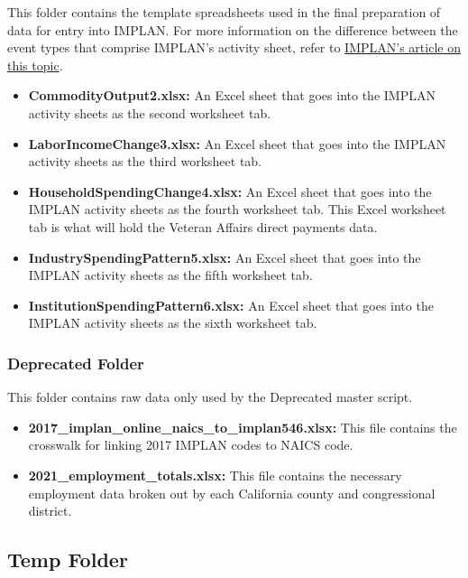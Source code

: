 \documentclass[
]{book}
\providecommand{\tightlist}{%
  \setlength{\itemsep}{0pt}\setlength{\parskip}{0pt}}
\begin{document}
This folder contains the template spreadsheets used in the final preparation of data for entry into IMPLAN. For more information on the difference between the event types that comprise IMPLAN's activity sheet, refer to \href{https://support.implan.com/hc/en-us/articles/360019638713-Explaining-Event-Types}{IMPLAN's article on this topic}.

\begin{itemize}
\tightlist
\item
  \textbf{CommodityOutput2.xlsx:} An Excel sheet that goes into the IMPLAN activity sheets as the second worksheet tab.
\item
  \textbf{LaborIncomeChange3.xlsx:} An Excel sheet that goes into the IMPLAN activity sheets as the third worksheet tab.
\item
  \textbf{HouseholdSpendingChange4.xlsx:} An Excel sheet that goes into the IMPLAN activity sheets as the fourth worksheet tab. This Excel worksheet tab is what will hold the Veteran Affairs direct payments data.
\item
  \textbf{IndustrySpendingPattern5.xlsx:} An Excel sheet that goes into the IMPLAN activity sheets as the fifth worksheet tab.
\item
  \textbf{InstitutionSpendingPattern6.xlsx:} An Excel sheet that goes into the IMPLAN activity sheets as the sixth worksheet tab.
\end{itemize}

\hypertarget{deprecated-raw}{%
\subsubsection{Deprecated Folder}\label{deprecated-raw}}

This folder contains raw data only used by the Deprecated master script.

\begin{itemize}
\tightlist
\item
  \textbf{2017\_implan\_online\_naics\_to\_implan546.xlsx:} This file contains the crosswalk for linking 2017 IMPLAN codes to NAICS code.
\item
  \textbf{2021\_employment\_totals.xlsx:} This file contains the necessary employment data broken out by each California county and congressional district.
\end{itemize}

\hypertarget{temp-folder}{%
\subsection{Temp Folder}\label{temp-folder}}
\end{document}
